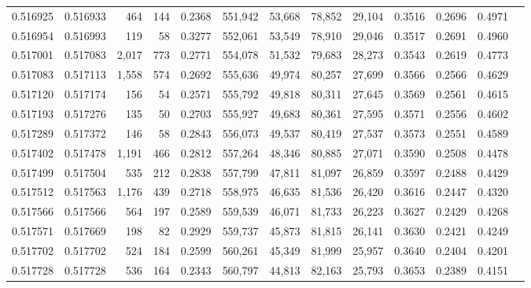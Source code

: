 \begin{tabular}{rrrrrrrrrrrrr}
0.516925 & 0.516933 &   464 &   144 &                                     0.2368 & 551,942 &  53,668 &  78,852 &  29,104 & 0.3516 & 0.2696 & 0.4971 \\
0.516954 & 0.516993 &   119 &    58 &                                     0.3277 & 552,061 &  53,549 &  78,910 &  29,046 & 0.3517 & 0.2691 & 0.4960 \\
0.517001 & 0.517083 & 2,017 &   773 &                                     0.2771 & 554,078 &  51,532 &  79,683 &  28,273 & 0.3543 & 0.2619 & 0.4773 \\
0.517083 & 0.517113 & 1,558 &   574 &                                     0.2692 & 555,636 &  49,974 &  80,257 &  27,699 & 0.3566 & 0.2566 & 0.4629 \\
0.517120 & 0.517174 &   156 &    54 &                                     0.2571 & 555,792 &  49,818 &  80,311 &  27,645 & 0.3569 & 0.2561 & 0.4615 \\
0.517193 & 0.517276 &   135 &    50 &                                     0.2703 & 555,927 &  49,683 &  80,361 &  27,595 & 0.3571 & 0.2556 & 0.4602 \\
0.517289 & 0.517372 &   146 &    58 &                                     0.2843 & 556,073 &  49,537 &  80,419 &  27,537 & 0.3573 & 0.2551 & 0.4589 \\
0.517402 & 0.517478 & 1,191 &   466 &                                     0.2812 & 557,264 &  48,346 &  80,885 &  27,071 & 0.3590 & 0.2508 & 0.4478 \\
0.517499 & 0.517504 &   535 &   212 &                                     0.2838 & 557,799 &  47,811 &  81,097 &  26,859 & 0.3597 & 0.2488 & 0.4429 \\
0.517512 & 0.517563 & 1,176 &   439 &                                     0.2718 & 558,975 &  46,635 &  81,536 &  26,420 & 0.3616 & 0.2447 & 0.4320 \\
0.517566 & 0.517566 &   564 &   197 &                                     0.2589 & 559,539 &  46,071 &  81,733 &  26,223 & 0.3627 & 0.2429 & 0.4268 \\
0.517571 & 0.517669 &   198 &    82 &                                     0.2929 & 559,737 &  45,873 &  81,815 &  26,141 & 0.3630 & 0.2421 & 0.4249 \\
0.517702 & 0.517702 &   524 &   184 &                                     0.2599 & 560,261 &  45,349 &  81,999 &  25,957 & 0.3640 & 0.2404 & 0.4201 \\
0.517728 & 0.517728 &   536 &   164 &                                     0.2343 & 560,797 &  44,813 &  82,163 &  25,793 & 0.3653 & 0.2389 & 0.4151 \\

\end{tabular}
